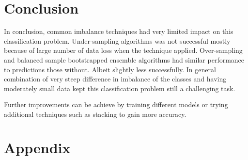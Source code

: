 \documentclass[12pt]{article}
\begin{document}
\section{Conclusion} \label{sec:conclution}

In conclusion, common imbalance techniques had very limited impact on this classification problem. Under-sampling algorithms was not successful mostly because of large number of data loss when the technique applied. Over-sampling and balanced sample bootstrapped ensemble algorithms had similar performance to predictions those without. Albeit slightly less successfully. In general combination of very steep difference in imbalance of the classes and having moderately small data kept this classification problem still a challenging task.

Further improvements can be achieve by training different models or trying additional techniques such as stacking to gain more accuracy.

\printbibliography
{}

\section*{Appendix}

\end{document}
